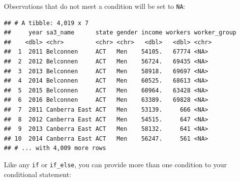 \documentclass[]{book}
\newenvironment{Shaded}{\begin{snugshade}}{\end{snugshade}}
\newcommand{\DataTypeTok}[1]{\textcolor[rgb]{0.13,0.29,0.53}{#1}}
\newcommand{\DecValTok}[1]{\textcolor[rgb]{0.00,0.00,0.81}{#1}}
\newcommand{\FloatTok}[1]{\textcolor[rgb]{0.00,0.00,0.81}{#1}}
\newcommand{\KeywordTok}[1]{\textcolor[rgb]{0.13,0.29,0.53}{\textbf{#1}}}
\newcommand{\NormalTok}[1]{#1}
\newcommand{\OperatorTok}[1]{\textcolor[rgb]{0.81,0.36,0.00}{\textbf{#1}}}
\newcommand{\OtherTok}[1]{\textcolor[rgb]{0.56,0.35,0.01}{#1}}
\newcommand{\StringTok}[1]{\textcolor[rgb]{0.31,0.60,0.02}{#1}}
\begin{document}
Observations that do not meet a condition will be set to \texttt{NA}:

\begin{Shaded}
\end{Shaded}

\begin{verbatim}
## # A tibble: 4,019 x 7
##     year sa3_name      state gender income workers worker_group
##    <dbl> <chr>         <chr> <chr>   <dbl>   <dbl> <chr>       
##  1  2011 Belconnen     ACT   Men    54105.   67774 <NA>        
##  2  2012 Belconnen     ACT   Men    56724.   69435 <NA>        
##  3  2013 Belconnen     ACT   Men    58918.   69697 <NA>        
##  4  2014 Belconnen     ACT   Men    60525.   68613 <NA>        
##  5  2015 Belconnen     ACT   Men    60964.   63428 <NA>        
##  6  2016 Belconnen     ACT   Men    63389.   69828 <NA>        
##  7  2011 Canberra East ACT   Men    53139.     666 <NA>        
##  8  2012 Canberra East ACT   Men    54515.     647 <NA>        
##  9  2013 Canberra East ACT   Men    58132.     641 <NA>        
## 10  2014 Canberra East ACT   Men    56247.     561 <NA>        
## # ... with 4,009 more rows
\end{verbatim}

Like any \texttt{if} or \texttt{if\_else}, you can provide more than one condition to your conditional statement:

\begin{Shaded}
\end{Shaded}
\end{document}
